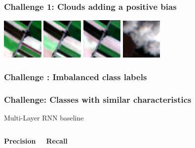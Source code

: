 \documentclass[%
  aspectratio=169,
  9pt,
  USenglish,
  titlegraphic, %
  affiliationintitlepagehead,
  affiliation,
]{beamer}
\begin{document}
\begin{frame}
\frametitle{Challenge 1: Clouds adding a positive bias}

\includegraphics[width=2cm]{images/s2grid/1}
\includegraphics[width=2cm]{images/s2grid/2}
\includegraphics[width=2cm]{images/s2grid/3}
\includegraphics[width=2cm]{images/s2grid/4}


\examplecorn

\end{frame}


\begin{frame}
\frametitle{Challenge : Imbalanced class labels}


\end{frame}

\begin{frame}
\frametitle{Challenge: Classes with similar characteristics}

Multi-Layer RNN baseline


\begin{columns}
	
	\textbf{Precision}
	
	
	\textbf{Recall}
	
	
\end{columns}

\end{frame}
\end{document}
